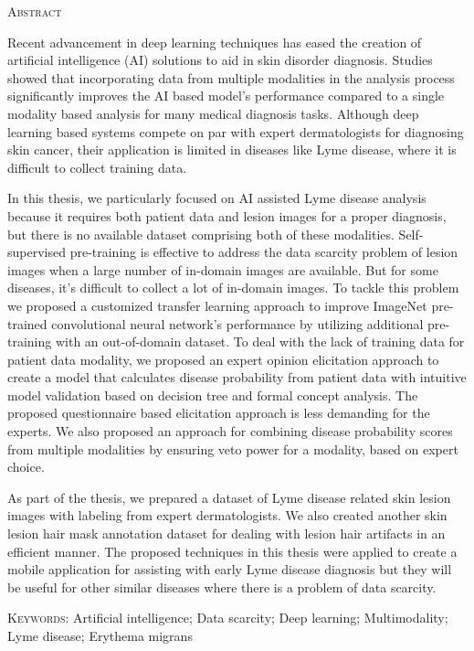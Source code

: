 \begin{center}
  \textsc{Abstract}
\end{center}
%
\noindent
%
Recent advancement in deep learning techniques has eased the creation of artificial intelligence (AI) solutions to aid in skin disorder diagnosis. Studies showed that incorporating data from multiple modalities in the analysis process significantly improves the AI based model’s performance compared to a single modality based analysis for many medical diagnosis tasks. Although deep learning based systems compete on par with expert dermatologists for diagnosing skin cancer, their application is limited in diseases like Lyme disease, where it is difficult to collect training data.

In this thesis, we particularly focused on AI assisted Lyme disease analysis because it requires both patient data and lesion images for a proper diagnosis, but there is no available dataset comprising both of these modalities. Self-supervised pre-training is effective to address the data scarcity problem of lesion images when a large number of in-domain images are available. But for some diseases, it's difficult to collect a lot of in-domain images. To tackle this problem we proposed a customized transfer learning approach to improve ImageNet pre-trained convolutional neural network’s performance by utilizing additional pre-training with an out-of-domain dataset. To deal with the lack of training data for patient data modality, we proposed an expert opinion elicitation approach to create a model that calculates disease probability from patient data with intuitive model validation based on decision tree and formal concept analysis. The proposed questionnaire based elicitation approach is less demanding for the experts.  We also proposed an approach for combining disease probability scores from multiple modalities by ensuring veto power for a modality, based on expert choice. 

As part of the thesis, we prepared a dataset of Lyme disease related skin lesion images with labeling from expert dermatologists. We also created another skin lesion hair mask annotation dataset for dealing with lesion hair artifacts in an efficient manner. The proposed techniques in this thesis were applied to create a mobile application for assisting with early Lyme disease diagnosis but they will be useful for other similar diseases where there is a problem of data scarcity.

\vspace{0.3cm}
\noindent \textsc{Keywords}: Artificial intelligence; Data scarcity; Deep learning; Multimodality; Lyme disease; Erythema migrans

